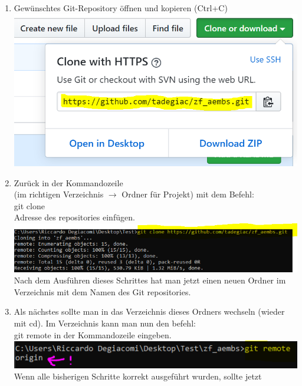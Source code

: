\documentclass[a4paper, 8pt]{extarticle}
\begin{document}
\begin{multicols*}{3}
\begin{enumerate}
                    \item   Gewünschtes Git-Repository öffnen und kopieren (Ctrl+C)
                                \includegraphics[width=1\linewidth, left]{img/git_repository_via_https.PNG}
                    \item   Zurück in der Kommandozeile\\ (im richtigen Verzeichnis $\rightarrow$ Ordner für Projekt)
                            mit dem Befehl:\\ git clone\\
                            Adresse des repositories einfügen.
                                \includegraphics[width=1\linewidth, left]{img/git_config_clone.PNG}
                            Nach dem Ausführen dieses Schrittes hat man jetzt einen neuen Ordner im Verzeichnis
                            mit dem Namen des Git repositories.
                    \item   Als nächstes sollte man in das Verzeichnis dieses Ordners wechseln (wieder mit cd).
                            Im Verzeichnis kann man nun den befehl:\\
                            git remote in der Kommandozeile eingeben. \\
                                \includegraphics[width=1\linewidth, left]{img/git_remot.PNG}
                            Wenn alle bisherigen Schritte korrekt ausgeführt wurden, sollte jetzt

\end{enumerate}
\end{multicols*}
\end{document}
